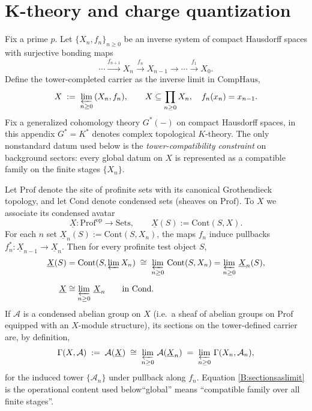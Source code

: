 \documentclass[11pt]{article}
\theoremstyle{remark}
\begin{document}
\section{K-theory and charge quantization}
\label{app:K-theory-quant}
Fix a prime $p$.
Let $\{X_n,f_n\}_{n\ge 0}$ be an inverse system of compact Hausdorff spaces with surjective bonding maps
\begin{equation}
\cdots \xrightarrow{f_{n+1}} X_n \xrightarrow{f_n} X_{n-1} \xrightarrow{}\cdots \xrightarrow{f_1} X_0 .
\label{B:tower}
\end{equation}
Define the tower-completed carrier as the inverse limit in $\mathrm{CompHaus}$,
\begin{equation}
X \;:=\; \varprojlim_{n\ge 0}\,(X_n,f_n),
\qquad
X \subseteq \prod_{n\ge 0} X_n,\quad f_n(x_n)=x_{n-1}.
\label{B:Xlimit}
\end{equation}
Fix a generalized cohomology theory $G^\ast(-)$ on compact Hausdorff spaces, in this appendix $G^\ast=K^\ast$ denotes complex topological $K$-theory.
The only nonstandard datum used below is the \emph{tower-compatibility constraint} on background sectors:
every global datum on $X$ is represented as a compatible family on the finite stages $\{X_n\}$.

Let $\mathrm{Prof}$ denote the site of profinite sets with its canonical Grothendieck topology, and let $\mathrm{Cond}$ denote condensed sets (sheaves on $\mathrm{Prof}$).
To $X$ we associate its condensed avatar
\begin{equation}
\underline{X}:\mathrm{Prof}^{\mathrm{op}}\to \mathrm{Sets},
\qquad
\underline{X}(S):=\mathrm{Cont}(S,X).
\label{B:condX}
\end{equation}
For each $n$ set $\underline{X}_n(S):=\mathrm{Cont}(S,X_n)$, the maps $f_n$ induce pullbacks $f_n^\ast:\underline{X}_{n-1}\to \underline{X}_n$.
Then for every profinite test object $S$,
\begin{align}
\underline{X}(S)
&=\mathrm{Cont}(S,\varprojlim X_n)
\;\cong\;
\varprojlim_{n\ge 0}\,\mathrm{Cont}(S,X_n)
=\varprojlim_{n\ge 0}\,\underline{X}_n(S),
\label{B:contlim}\\[2mm]
\underline{X}
&\cong
\varprojlim_{n\ge 0}\,\underline{X}_n
\qquad\text{in }\mathrm{Cond}.
\label{B:condlimit}
\end{align}
If $\mathcal{A}$ is a condensed abelian group on $X$ (i.e.\ a sheaf of abelian groups on $\mathrm{Prof}$ equipped with an $X$-module structure), its sections on the tower-defined carrier are, by definition,
\begin{equation}
\Gamma(X,\mathcal{A})
\;:=\;
\mathcal{A}(\underline{X})
\;\cong\;
\varprojlim_{n\ge 0}\,\mathcal{A}(\underline{X}_n)
\;=\;
\varprojlim_{n\ge 0}\,\Gamma(X_n,\mathcal{A}_n),
\label{B:sectionsaslimit}
\end{equation}
for the induced tower $\{\mathcal{A}_n\}$ under pullback along $f_n$.
Equation \eqref{B:sectionsaslimit} is the operational content used below\:``global'' means ``compatible family over all finite stages''.
\end{document}
